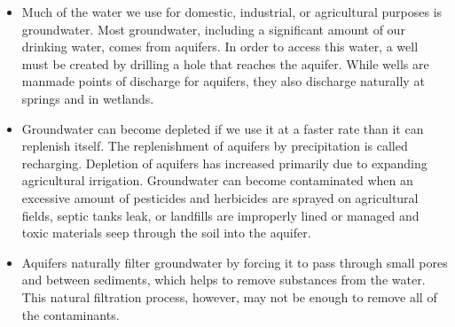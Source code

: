 \begin{itemize}
\begin{enumerate}
\begin{itemize}
\item Much of the water we use for domestic, industrial, or agricultural purposes is groundwater. Most groundwater, including a significant amount of our drinking water, comes from aquifers. In order to access this water, a well must be created by drilling a hole that reaches the aquifer. While wells are manmade points of discharge for aquifers, they also discharge naturally at springs and in wetlands.

\item Groundwater can become depleted if we use it at a faster rate than it can replenish itself. The replenishment of aquifers by precipitation is called recharging. Depletion of aquifers has increased primarily due to expanding agricultural irrigation. Groundwater can become contaminated when an excessive amount of pesticides and herbicides are sprayed on agricultural fields, septic tanks leak, or landfills are improperly lined or managed and toxic materials seep through the soil into the aquifer.

\item Aquifers naturally filter groundwater by forcing it to pass through small pores and between sediments, which helps to remove substances from the water. This natural filtration process, however, may not be enough to remove all of the contaminants.


\end{itemize}
\end{enumerate}
\end{itemize}
